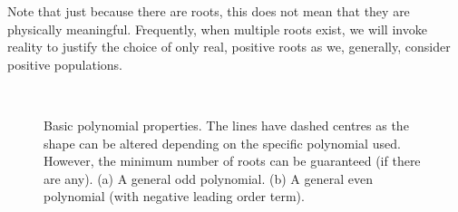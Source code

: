 Note that just because there are roots, this does not mean that they are physically meaningful. Frequently, when multiple roots exist, we will invoke reality to justify the choice of only real, positive roots as we, generally, consider positive populations.
\begin{figure}[p!!!h!!!tbp]
\centering
{}
\\
\caption{\label{Poly_sketches}Basic polynomial properties. The lines have dashed centres as the shape can be altered depending on the specific polynomial used. However, the minimum number of roots can be guaranteed (if there are any). (a) A general odd polynomial. (b) A general even polynomial (with negative leading order term).}
\end{figure}



